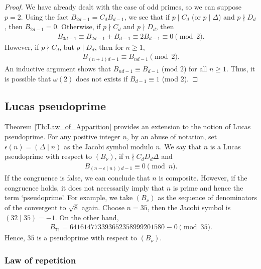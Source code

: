 \documentclass[12pt]{article}
\theoremstyle{plain}
\theoremstyle{definition}
\theoremstyle{remark}
\begin{document}
\begin{proof}
We have already dealt with the case of odd primes, so we can suppose $ p = 2 $. Using the fact $ B_{2d - 1} = C_d B_{d - 1} $, we see that if $ p \mid C_d $ (or $ p \mid \Delta $) and $ p \nmid D_d $, then $ B_{2d - 1} = 0 $. Otherwise, if $ p \nmid C_d $ and $ p \nmid D_d $, then 
\begin{align*}
	B_{3d - 1} \equiv B_{2d - 1} + B_{d - 1} \equiv 2B_{d - 1} \equiv 0 \pmod{2}.
\end{align*}
However, if $ p \nmid C_d $, but $ p \mid D_d $, then for $ n \geq 1 $,
\begin{align*}
	B_{(n + 1)d - 1} \equiv B_{nd - 1} \pmod{2}.
\end{align*}
An inductive argument shows that $ B_{nd - 1} \equiv B_{d - 1} $ (mod $ 2 $) for all $ n \geq 1 $. Thus, it is possible that $ \omega (2) $ does not exists if $ B_{d - 1} \equiv 1 $ (mod $ 2 $).
\end{proof}

\subsection{Lucas pseudoprime}

Theorem \ref{Th:Law_of_Apparition} provides an extension to the notion of Lucas pseudoprime. For any positive integer $ n $, by an abuse of notation, set $ \epsilon (n) = (\Delta \mid n) $ as the Jacobi symbol modulo $ n $. We say that $ n $ is a Lucas pseudoprime with respect to $ (B_\nu) $, if $ n \nmid C_d D_d \Delta $ and 
\begin{align*}
	B_{(n - \epsilon (n))d - 1} \equiv 0 \pmod{n}.
\end{align*}
If the congruence is false, we can conclude that $ n $ is composite. However, if the congruence holds, it does not necessarily imply that $ n $ is prime and hence the term `pseudoprime'. For example, we take $ (B_\nu) $ as the sequence of denominators of the convergent to $ \sqrt{8} $ again. Choose $ n = 35 $, then the Jacobi symbol is $ (32 \mid 35) = -1 $. On the other hand, 
\begin{align*}
	B_{71} = 641614773393652358999201580 \equiv 0 \pmod{35}.
\end{align*}
Hence, $ 35 $ is a pseudoprime with respect to $ (B_\nu) $.

\subsubsection{Law of repetition}
\end{document}
